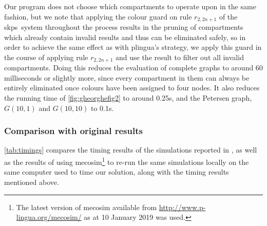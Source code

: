 Our program does not choose which compartments to operate upon in the same fashion, but we note that applying the colour guard on rule \(r_{2,2n+1}\) of the \gls{skps}~system throughout the process results in the pruning of compartments which already contain invalid results and thus can be eliminated safely, so in order to achieve the same effect as with \gls{plingua}'s strategy, we apply this guard in the course of applying rule \(r_{2,2n+1}\) and use the result to filter out all invalid compartments.  Doing this reduces the evaluation of complete graphs to around 60 milliseconds or slightly more, since every compartment in them can always be entirely eliminated once colours have been assigned to four nodes.  It also reduces the running time of \autoref{fig:gheorghefig2} to around 0.25s, and the Petersen graph, \(G(10,1)\) and \(G(10,10)\) to 0.1s.

\subsubsection{Comparison with original results}

\autoref{tab:timings} compares the timing results of the simulations reported in \cite{Gheorghe2013}, as well as the results of using \gls{mecosim}\footnote{The latest version of \gls{mecosim} available from \url{http://www.p-lingua.org/mecosim/} as at 10 January 2019 was used.} \cite{Perez-Hurtado2010} to re-run the same simulations locally on the same computer used to time our solution, along with the timing results mentioned above.

